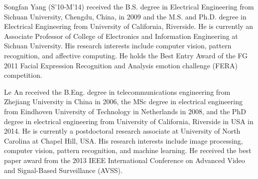 \documentclass[10pt,journal]{IEEEtran}
\begin{document}

%
%
%




\begin{IEEEbiography}{Songfan Yang}
(S'10-M'14) received the B.S. degree in Electrical Engineering from Sichuan University, Chengdu, China, in 2009 and the M.S. and Ph.D. degree in Electrical Engineering from University of California, Riverside. He is currently an Associate Professor of College of Electronics and Information Engineering at Sichuan University. His research interests include computer vision, pattern recognition, and affective computing. He holds the Best Entry Award of the FG 2011 Facial Expression Recognition and Analysis emotion challenge (FERA) competition.
\end{IEEEbiography}

\begin{IEEEbiography}{Le An} received the B.Eng. degree in telecommunications engineering from Zhejiang University in China in 2006, the MSc degree in electrical engineering from Eindhoven University of Technology in Netherlands in 2008, and the PhD degree in electrical engineering from University of California, Riverside in USA in 2014. He is currently a postdoctoral research associate at University of North Carolina at Chapel Hill, USA.  
His research interests include image processing, computer vision, pattern recognition, and machine learning. He received the best paper award from the 2013 IEEE International Conference on Advanced Video and Signal-Based Surveillance (AVSS).
\end{IEEEbiography}
\end{document}
